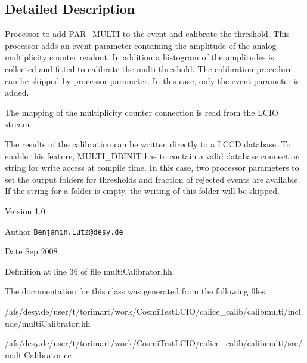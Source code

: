 \subsection{Detailed Description}
Processor to add PAR\_\-MULTI to the event and calibrate the threshold. This processor adds an event parameter containing the amplitude of the analog multiplicity counter readout. In addition a histogram of the amplitudes is collected and fitted to calibrate the multi threshold. The calibration procedure can be skipped by processor parameter. In this case, only the event parameter is added.

The mapping of the multiplicity counter connection is read from the LCIO stream.

The results of the calibration can be written directly to a LCCD database. To enable this feature, MULTI\_\-DBINIT has to contain a valid database connection string for write access at compile time. In this case, two processor parameters to set the output folders for thresholds and fraction of rejected events are available. If the string for a folder is empty, the writing of this folder will be skipped.

\begin{DoxyVersion}{Version}
1.0 
\end{DoxyVersion}
\begin{DoxyAuthor}{Author}
{\tt Benjamin.Lutz@desy.de} 
\end{DoxyAuthor}
\begin{DoxyDate}{Date}
Sep 2008 
\end{DoxyDate}


Definition at line 36 of file multiCalibrator.hh.

The documentation for this class was generated from the following files:\begin{DoxyCompactItemize}
\item 
/afs/desy.de/user/t/torimart/work/CosmiTestLCIO/calice\_\-calib/calibmulti/include/multiCalibrator.hh\item 
/afs/desy.de/user/t/torimart/work/CosmiTestLCIO/calice\_\-calib/calibmulti/src/multiCalibrator.cc\end{DoxyCompactItemize}
